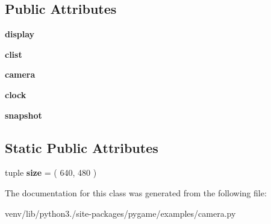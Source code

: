 \subsection*{Public Attributes}
\begin{DoxyCompactItemize}
\item 
\mbox{\label{classpygame_1_1examples_1_1camera_1_1_video_capture_player_a70642fc6cf26b4dacc9223ddbd0dff8a}} 
{\bfseries display}
\item 
\mbox{\label{classpygame_1_1examples_1_1camera_1_1_video_capture_player_a30bfe2a5af5de29216a4a1a326aa5a18}} 
{\bfseries clist}
\item 
\mbox{\label{classpygame_1_1examples_1_1camera_1_1_video_capture_player_af92153da8b13864b099effeaa851c72d}} 
{\bfseries camera}
\item 
\mbox{\label{classpygame_1_1examples_1_1camera_1_1_video_capture_player_ad3a90e097f1c40e5637053224887f338}} 
{\bfseries clock}
\item 
\mbox{\label{classpygame_1_1examples_1_1camera_1_1_video_capture_player_a8f2bc22b95bf89ffbe8b9a1c26acd1f3}} 
{\bfseries snapshot}
\end{DoxyCompactItemize}
\subsection*{Static Public Attributes}
\begin{DoxyCompactItemize}
\item 
\mbox{\label{classpygame_1_1examples_1_1camera_1_1_video_capture_player_ae3bae4c3db000d5dbfb02ef4baadb4ac}} 
tuple {\bfseries size} = ( 640, 480 )
\end{DoxyCompactItemize}


The documentation for this class was generated from the following file\+:\begin{DoxyCompactItemize}
\item 
venv/lib/python3./site-\/packages/pygame/examples/camera.\+py\end{DoxyCompactItemize}
